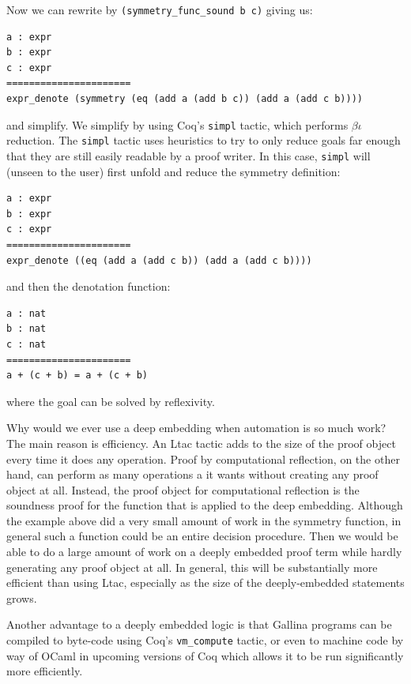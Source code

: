 \documentclass{puthesis}
\begin{document}
Now we can rewrite by \lstinline|(symmetry_func_sound b c)| giving us:

\begin{verbatim}
a : expr
b : expr
c : expr
======================
expr_denote (symmetry (eq (add a (add b c)) (add a (add c b))))  
\end{verbatim}

and simplify. We simplify by using Coq's \lstinline|simpl| tactic,
which performs $\beta\iota$ reduction. The \lstinline|simpl| tactic uses
heuristics to try to only reduce goals far enough that they are still
easily readable by a proof writer. In this case, \lstinline|simpl| 
will (unseen to the user) first unfold and reduce the symmetry
definition:

\begin{verbatim}
a : expr
b : expr
c : expr
======================
expr_denote ((eq (add a (add c b)) (add a (add c b))))  
\end{verbatim}

\noindent and then the denotation function:

\begin{verbatim}
a : nat
b : nat
c : nat
======================
a + (c + b) = a + (c + b) 
\end{verbatim}

\noindent where the goal can be solved by reflexivity.

Why would we ever use a deep embedding when automation is so much
work? The main reason is efficiency. An Ltac tactic adds to the size
of the proof object every time it does any operation. Proof by
computational reflection, on the other hand, can perform as many
operations a it wants without creating any proof object at
all. Instead, the proof object for computational reflection is the
soundness proof for the function that is applied to the deep
embedding. Although the example above did a very small amount of work
in the symmetry function, in general such a function could be an
entire decision procedure. Then we would be able to do a large amount
of work on a deeply embedded proof term while hardly generating any
proof object at all. In general, this will be substantially more
efficient than using Ltac, especially as the size of the
deeply-embedded statements grows.

Another advantage to a deeply embedded logic is that Gallina programs
can be compiled to byte-code using Coq's \lstinline|vm_compute|
tactic, or even to machine code by way of OCaml in upcoming versions
of Coq which allows it to be run significantly more efficiently.
\end{document}
